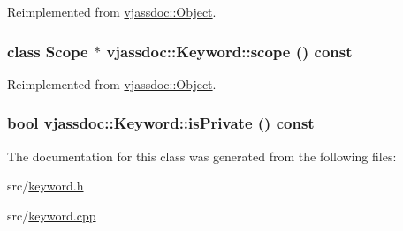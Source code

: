 Reimplemented from \hyperlink{classvjassdoc_1_1Object_cc4241505c5bcdd0bbcb08a1b665b3fd}{vjassdoc::Object}.\hypertarget{classvjassdoc_1_1Keyword_5524a7a3029192c2c460a1914cce63e3}{
\subsubsection{\setlength{\rightskip}{0pt plus 5cm}class {\bf Scope} $\ast$ vjassdoc::Keyword::scope () const}}
\label{classvjassdoc_1_1Keyword_5524a7a3029192c2c460a1914cce63e3}




Reimplemented from \hyperlink{classvjassdoc_1_1Object_0738d05b196cc8b9e89d62839d81fc20}{vjassdoc::Object}.\hypertarget{classvjassdoc_1_1Keyword_f07683a667bfdfaa4dfa82da6844af97}{
\subsubsection{\setlength{\rightskip}{0pt plus 5cm}bool vjassdoc::Keyword::isPrivate () const}}
\label{classvjassdoc_1_1Keyword_f07683a667bfdfaa4dfa82da6844af97}




The documentation for this class was generated from the following files:\begin{CompactItemize}
\item 
src/\hyperlink{keyword_8h}{keyword.h}\item 
src/\hyperlink{keyword_8cpp}{keyword.cpp}\end{CompactItemize}
